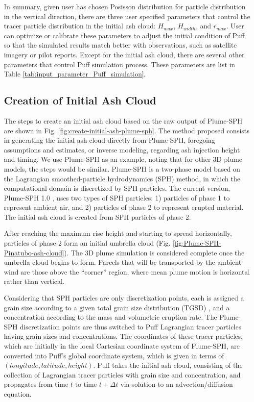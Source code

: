 \documentclass[utf8]{frontiersSCNS} %
\begin{document}
In summary, given user has chosen Posisson distribution for particle distribution in the vertical direction, there are three user specified parameters that control the tracer particle distribution in the initial ash cloud: $H_{max}$, $H_{width}$, and $r_{max}$. User can optimize or calibrate these parameters to adjust the initial condition of Puff so that the simulated results match better with observations, such as satellite imagery or pilot reports. Except for the initial ash cloud, there are several other parameters that control Puff simulation process. These parameters are list in Table \ref{tab:input_parameter_Puff_simulation}.

\subsection{Creation of Initial Ash Cloud} \label{sec:create-initial-condition}
The steps to create an initial ash cloud based on the raw output of Plume-SPH are shown in Fig. \ref{fig:create-initial-ash-plume-sph}.
The method proposed consists in generating the initial ash cloud directly from Plume-SPH, foregoing assumptions and estimates, or inverse modeling, regarding ash injection height and timing.
We use Plume-SPH as an example, noting that for other 3D plume models, the steps would be similar. Plume-SPH is a two-phase model based on the Lagrangian smoothed-particle hydrodynamics (SPH) method, in which the computational domain is discretized by SPH particles. The current version, Plume-SPH 1.0 \citep{cao2018plume}, uses two types of SPH particles: 1) particles of phase 1 to represent ambient air, and 2) particles of phase 2 to represent erupted material. The initial ash cloud is created from SPH particles of phase 2.

After reaching the maximum rise height and starting to spread horizontally, particles of phase 2 form an initial umbrella cloud (Fig. \ref{fig:Plume-SPH-Pinatubo-ash-cloud}). The 3D plume simulation is considered complete once the umbrella cloud begins to form. Parcels that will be transported by the ambient wind are those above the ``corner'' region, where mean plume motion is horizontal rather than vertical.

Considering that SPH particles are only discretization points, each is assigned a grain size according to a given total grain size distribution (TGSD) \citep{paladio1996tephra}, and a concentration according to the mass and volumetric eruption rate. The Plume-SPH discretization points are thus switched to Puff Lagrangian tracer particles having grain sizes and concentrations. The coordinates of these tracer particles, which are initially in the local Cartesian coordinate system of Plume-SPH, are converted into Puff's global coordinate system, which is given in terms of $(longitude, latitude, height)$. Puff takes the initial ash cloud, consisting of the collection of Lagrangian tracer particles with grain size and concentration, and propagates from time $t$ to time $t+\Delta t$ via solution to an advection/diffusion equation.
\end{document}
